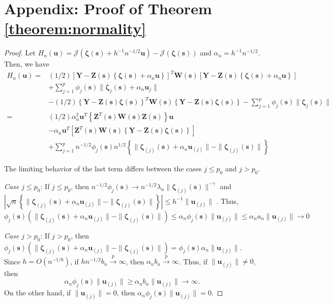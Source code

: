 \documentclass[authoryear,review, 12pt]{elsarticle}
\begin{document}
\section*{Appendix: Proof of Theorem \ref{theorem:normality}\label{sec:gaussian-normality-proof} }
\begin{proof}
Let $H_{n}(\bm{u})=\mathcal{J}\left(\bm{\zeta}\left(\bm{s}\right)+h^{-1}n^{-1/2}\bm{u}\right)-\mathcal{J}\left(\bm{\zeta}\left(\bm{s}\right)\right)$
and $\alpha_{n}=h^{-1}n^{-1/2}$. Then, we have 
\begin{align*}
H_{n}\left(\bm{u}\right)= & (1/2)\left[\bm{Y}-\bm{Z}(\bm{s})\left\{ \bm{\zeta}\left(\bm{s}\right)+\alpha_{n}\bm{u}\right\} \right]^{T}\bm{W}(\bm{s})\left[\bm{Y}-\bm{Z}(\bm{s})\left\{ \bm{\zeta}\left(\bm{s}\right)+\alpha_{n}\bm{u}\right\} \right]\\
 & +\sum_{j=1}^{p}\phi_{j}(\bm{s})\|\bm{\zeta}_{j}(\bm{s})+\alpha_{n}\bm{u}_{j}\|\\
 & -(1/2)\left\{ \bm{Y}-\bm{Z}(\bm{s})\bm{\zeta}(\bm{s})\right\} ^{T}\bm{W}(\bm{s})\left\{ \bm{Y}-\bm{Z}(\bm{s})\bm{\zeta}(\bm{s})\right\} -\sum_{j=1}^{p}\phi_{j}(\bm{s})\|\bm{\zeta}_{j}(\bm{s})\|\\
= & \left(1/2\right)\alpha_{n}^{2}\bm{u}^{T}\left\{ \bm{Z}^{T}(\bm{s})\bm{W}(\bm{s})\bm{Z}(\bm{s})\right\} \bm{u}\\
 & -\alpha_{n}\bm{u}^{T}\left[\bm{Z}^{T}(\bm{s})\bm{W}(\bm{s})\left\{ \bm{Y}-\bm{Z}(\bm{s})\bm{\zeta}(\bm{s})\right\} \right]\\
 & +\sum_{j=1}^{p}n^{-1/2}\phi_{j}(\bm{s})n^{1/2}\left\{ \|\bm{\zeta}_{\left(j\right)}(\bm{s})+\alpha_{n}\bm{u}_{\left(j\right)}\|-\|\bm{\zeta}_{\left(j\right)}(\bm{s})\|\right\} 
\end{align*}


The limiting behavior of the last term differs between the cases $j\le p_{0}$
and $j>p_{0}$.

\emph{Case $j\le p_{0}$}: If $j\le p_{0}$, then $n^{-1/2}\phi_{j}(\bm{s})\to n^{-1/2}\lambda_{n}\|\bm{\zeta}_{\left(j\right)}(\bm{s})\|^{-\gamma}$
and $|\sqrt{n}\left\{ \|\bm{\zeta}_{\left(j\right)}(\bm{s})+\alpha_{n}\bm{u}_{\left(j\right)}\|-\|\bm{\zeta}_{\left(j\right)}(\bm{s})\|\right\} |\le h^{-1}\|\bm{u}_{\left(j\right)}\|$
. Thus, 
\[
\phi_{j}(\bm{s})\left(\|\bm{\zeta}_{\left(j\right)}(\bm{s})+\alpha_{n}\bm{u}_{\left(j\right)}\|-\|\bm{\zeta}_{\left(j\right)}(\bm{s})\|\right)\le\alpha_{n}\phi_{j}(\bm{s})\|\bm{u}_{\left(j\right)}\|\le\alpha_{n}a_{n}\|\bm{u}_{\left(j\right)}\|\to0
\]


\emph{Case $j>p_{0}$}: If $j>p_{0}$, then $\phi_{j}(\bm{s})\left(\|\bm{\zeta}_{\left(j\right)}(\bm{s})+\alpha_{n}\bm{u}_{\left(j\right)}\|-\|\bm{\zeta}_{\left(j\right)}(\bm{s})\|\right)=\phi_{j}(\bm{s})\alpha_{n}\|\bm{u}_{\left(j\right)}\|$.
Since $h=O(n^{-1/6})$, if $hn^{-1/2}b_{n}\xrightarrow{p}\infty$,
then $\alpha_{n}b_{n}\xrightarrow{p}\infty$. Thus, if $\|\bm{u}_{\left(j\right)}\|\ne0$,
then 
\[
\alpha_{n}\phi_{j}(\bm{s})\|\bm{u}_{\left(j\right)}\|\ge\alpha_{n}b_{n}\|\bm{u}_{\left(j\right)}\|\to\infty.
\]
On the other hand, if $\|\bm{u}_{\left(j\right)}\|=0$, then $\alpha_{n}\phi_{j}(\bm{s})\|\bm{u}_{\left(j\right)}\|=0$.


\end{proof}
\end{document}

